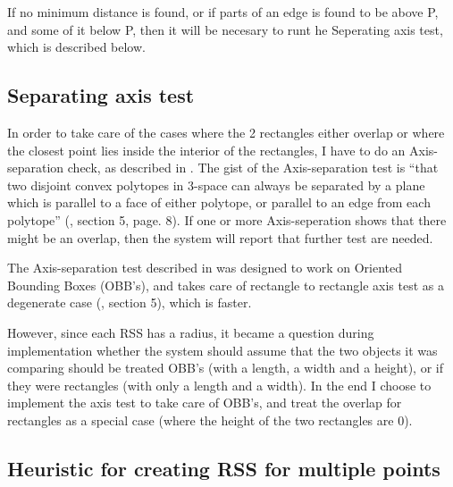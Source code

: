 If no minimum distance is found, or if parts of an edge is found to be above P, and some of it below P, then it will be necesary to runt he Seperating axis test, which is described below.

\subsection{Separating axis test}
\label{sepAxis}
In order to take care of the cases where the 2 rectangles either overlap or where the closest point lies inside the interior of the rectangles, I have to do an Axis-separation check, as described in \cite{237244}. The gist of the Axis-separation test is ``that two disjoint convex polytopes in 3-space can always be separated by a plane which is parallel to a face of either polytope, or parallel to an edge from each polytope'' (\cite{237244}, section 5, page. 8). If one or more Axis-seperation shows that there might be an overlap, then the system will report that further test are needed.

The Axis-separation test described in \cite{237244} was designed to work on Oriented Bounding Boxes (OBB's), and takes care of rectangle to rectangle axis test as a degenerate case (\cite{237244}, section 5), which is faster. 

However, since each RSS has a radius, it became a question during implementation whether the system should assume that the two objects it was comparing should be treated OBB's (with a length, a width and a height), or if they were rectangles (with only a length and a width). In the end I choose to implement the axis test to take care of OBB's, and treat the overlap for rectangles as a special case (where the height of the two rectangles are 0).

\subsection{Heuristic for creating RSS for multiple points}
